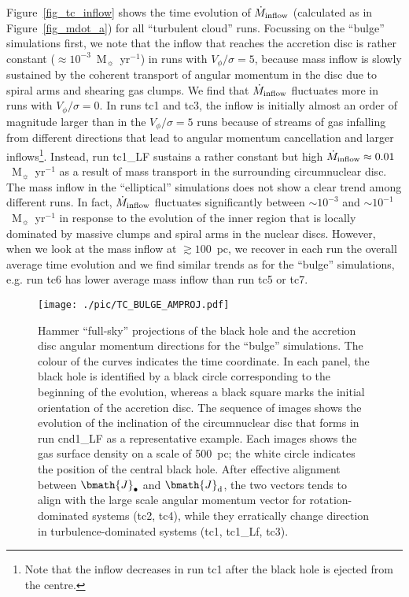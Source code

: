 \documentclass[a4paper,fleqn,usenatbib]{mnras}
\begin{document}
Figure~\ref{fig_tc_inflow} shows the time evolution of $\dot{M}_{\rm inflow}$ (calculated as in Figure~\ref{fig_mdot_a}) for all ``turbulent cloud'' runs.
Focussing on the ``bulge'' simulations first, we note that the inflow that reaches the accretion disc is rather constant ($\approx 10^{-3}$~M$_{\sun}$~yr$^{-1}$) in runs with $V_{\phi}/\sigma = 5$, because mass inflow is slowly sustained by the coherent transport of angular momentum
in the disc due to spiral arms and shearing gas clumps.
We find that $\dot{M}_{\rm inflow}$ fluctuates more in runs with $V_{\phi}/\sigma = 0$.
In runs tc1 and tc3, the inflow is initially almost an order of magnitude larger than in the $V_{\phi}/\sigma = 5$ runs because of streams of gas infalling from different directions that lead to angular momentum cancellation and larger inflows\footnote{Note that the inflow decreases in run tc1 after the black hole is ejected from the centre.}.
Instead, run tc1\_LF sustains a rather constant but high $\dot{M}_{\rm inflow} \approx 0.01$~M$_{\sun}$~yr$^{-1}$ as a result of mass transport in the surrounding circumnuclear disc.
The mass inflow in the ``elliptical'' simulations does not show a clear trend among different runs.
In fact, $\dot{M}_{\rm inflow}$ fluctuates significantly between $\sim 10^{-3}$ and $\sim 10^{-1}$~M$_{\sun}$~yr$^{-1}$ in response to the evolution of the inner region that is locally dominated by massive clumps and spiral arms in the nuclear discs.
However, when we look at the mass inflow at $\gtrsim 100$~pc, we recover in each run the overall average time evolution and we find similar trends as for the ``bulge'' simulations, e.g. run tc6 has lower average mass inflow than run tc5 or tc7.

\begin{figure*}
\begin{center}
\texttt{[image: ./pic/TC\_BULGE\_AMPROJ.pdf]}
\caption{Hammer ``full-sky'' projections of the black hole and the accretion disc angular momentum directions for the ``bulge'' simulations.
The colour of the curves indicates the time coordinate.
In each panel, the black hole is identified by a black circle corresponding to the beginning of the evolution, whereas a black square marks the initial orientation of the accretion disc.
The sequence of images shows the evolution of the inclination of the circumnuclear disc that forms in run cnd1\_LF as a representative example.
Each images shows the gas surface density on a scale of 500~pc; the white circle indicates the position of the central black hole.
After effective alignment between $\bmath{J}_{\bullet}$ and $\bmath{J}_{\rm d}$, the two vectors tends to align with the large scale angular momentum vector for rotation-dominated systems (tc2, tc4), while they erratically change direction in turbulence-dominated systems (tc1, tc1\_Lf, tc3).
}
\label{fig_tc_bulge_amproj}
\end{center}
\end{figure*}
\end{document}
